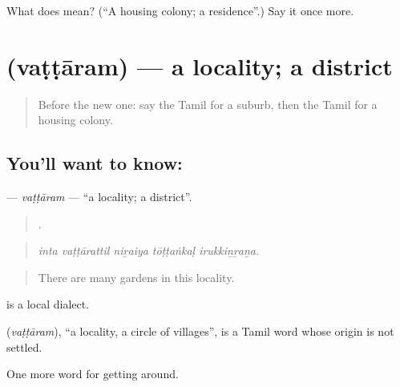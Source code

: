 \begin{tcolorbox}[breakable,colback=teal!4,colframe=teal!35!black,title={Before you move on}]
What does  mean? (\textquotedblleft{}A housing colony; a residence\textquotedblright{}.) Say it once more.
\end{tcolorbox}
\section[\texorpdfstring{\ta{வட்டாரம்} (vaṭṭāram)}{வட்டாரம் (vaṭṭāram)}]{ (vaṭṭāram) — a locality; a district}

\label{lesson:TA-C423-vattaram}



\begin{quote}
Before the new one: say the Tamil for a suburb, then the Tamil for a housing colony.
\end{quote}

\subsection*{You'll want to know: }
\textbf{} — \emph{vaṭṭāram} — \textquotedblleft{}a locality; a district\textquotedblright{}.

\begin{quote}
    .
\end{quote}

\begin{quote}
\emph{inta vaṭṭārattil niṟaiya tōṭṭaṅkaḷ irukkiṉṟaṉa.}
\end{quote}

\begin{quote}
There are many gardens in this locality.
\end{quote}

  is a local dialect.

\begin{cousinweb}
\textbf{} (\emph{vaṭṭāram}), \textquotedblleft{}a locality, a circle of villages\textquotedblright{}, is a Tamil word whose origin is not settled.
\end{cousinweb}

\begin{grammarlens}[title={What you've built}]
One more word for getting around.
\end{grammarlens}

